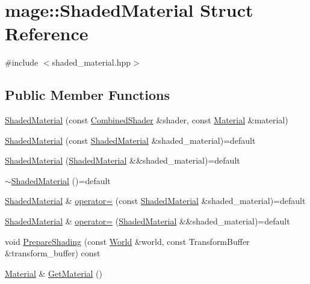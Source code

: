 \hypertarget{structmage_1_1_shaded_material}{}\section{mage\+:\+:Shaded\+Material Struct Reference}
\label{structmage_1_1_shaded_material}


{\ttfamily \#include $<$shaded\+\_\+material.\+hpp$>$}

\subsection*{Public Member Functions}
\begin{DoxyCompactItemize}
\item 
\hyperlink{structmage_1_1_shaded_material_a58594c0008865c68efc6ff6868016236}{Shaded\+Material} (const \hyperlink{structmage_1_1_combined_shader}{Combined\+Shader} \&shader, const \hyperlink{structmage_1_1_material}{Material} \&material)
\item 
\hyperlink{structmage_1_1_shaded_material_a8bd45b489933e89f0a16f79e29161c27}{Shaded\+Material} (const \hyperlink{structmage_1_1_shaded_material}{Shaded\+Material} \&shaded\+\_\+material)=default
\item 
\hyperlink{structmage_1_1_shaded_material_acd222233b31513b095e26aa6e38c4a99}{Shaded\+Material} (\hyperlink{structmage_1_1_shaded_material}{Shaded\+Material} \&\&shaded\+\_\+material)=default
\item 
\hyperlink{structmage_1_1_shaded_material_ac7be54322faed90a07b26225e270e571}{$\sim$\+Shaded\+Material} ()=default
\item 
\hyperlink{structmage_1_1_shaded_material}{Shaded\+Material} \& \hyperlink{structmage_1_1_shaded_material_ade9ec3ee6aae198e695240a5b89a0d72}{operator=} (const \hyperlink{structmage_1_1_shaded_material}{Shaded\+Material} \&shaded\+\_\+material)=default
\item 
\hyperlink{structmage_1_1_shaded_material}{Shaded\+Material} \& \hyperlink{structmage_1_1_shaded_material_a29fb482ab140fcb47709ffda03a67714}{operator=} (\hyperlink{structmage_1_1_shaded_material}{Shaded\+Material} \&\&shaded\+\_\+material)=default
\item 
void \hyperlink{structmage_1_1_shaded_material_afa872233ffdf89f7d60c1ac53d574e3e}{Prepare\+Shading} (const \hyperlink{classmage_1_1_world}{World} \&world, const Transform\+Buffer \&transform\+\_\+buffer) const
\item 
\hyperlink{structmage_1_1_material}{Material} \& \hyperlink{structmage_1_1_shaded_material_a785d01e0156c6aba84d479917b62ab03}{Get\+Material} ()

\end{DoxyCompactItemize}
